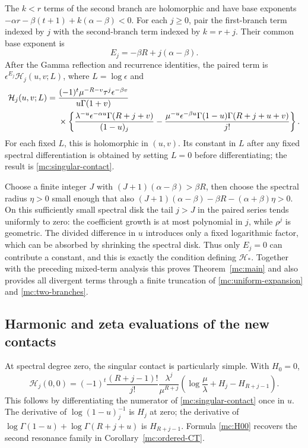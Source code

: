 \documentclass[11pt,a4paper]{article}
\numberwithin{equation}{section}
\theoremstyle{definition}
\theoremstyle{remark}
\begin{document}
The $k<r$ terms of the second branch are holomorphic and have
base exponents
$-\alpha r-\beta(t+1)+k(\alpha-\beta)<0$.
For each $j\ge0$, pair the first-branch term indexed by $j$ with
the second-branch term indexed by $k=r+j$. Their common base
exponent is
\begin{equation}\label{mc:paired-exponent}
                    E_j=-\beta R+j(\alpha-\beta).
\end{equation}
After the Gamma reflection and recurrence identities, the paired
term is $\epsilon^{E_j}\mathcal H_j(u,v;L)$, where $L=\log\epsilon$
and
\begin{align}\label{mc:H-log}
 \mathcal H_j(u,v;L)={}&
 \frac{(-1)^t\mu^{-R-v}\tau^j\epsilon^{-\beta v}}
                   {u\Gamma(1+v)}\notag\\
 &\times\left\{
 \frac{\lambda^{-u}\epsilon^{-\alpha u}\Gamma(R+j+v)}{(1-u)_j}
 -\frac{\mu^{-u}\epsilon^{-\beta u}
              \Gamma(1-u)\Gamma(R+j+u+v)}{j!}\right\}.
\end{align}
For each fixed $L$, this is holomorphic in $(u,v)$.
Its constant in $L$ after any fixed spectral differentiation is
obtained by setting $L=0$ before differentiating; the result is
\eqref{mc:singular-contact}.

Choose a finite integer $J$ with $(J+1)(\alpha-\beta)>\beta R$,
then choose the spectral radius $\eta>0$ small enough that also
$(J+1)(\alpha-\beta)-\beta R-(\alpha+\beta)\eta>0$.
On this sufficiently small spectral disk the tail $j>J$ in the
paired series tends uniformly to zero: the coefficient growth
is at most polynomial in $j$, while $\rho^j$ is geometric.
The divided difference in $u$ introduces only a fixed logarithmic
factor, which can be absorbed by shrinking the spectral disk.
Thus only $E_j=0$ can contribute a constant, and this is exactly
the condition defining $\mathcal H_*$. Together with the preceding
mixed-term analysis this proves Theorem~\ref{mc:main} and also
provides all divergent terms through a finite truncation of
\eqref{mc:uniform-expansion} and \eqref{mc:two-branches}.

\subsection{Harmonic and zeta evaluations of the new contacts}

At spectral degree zero, the singular contact is particularly
simple. With $H_0=0$,
\begin{equation}\label{mc:H00}
 \boxed{\displaystyle
 \mathcal H_j(0,0)=(-1)^t\frac{(R+j-1)!}{j!}
       \frac{\lambda^j}{\mu^{R+j}}
             \left(\log\frac\mu\lambda+H_j-H_{R+j-1}\right).}
\end{equation}
This follows by differentiating the numerator of
\eqref{mc:singular-contact} once in $u$.
The derivative of $\log(1-u)_j^{-1}$ is $H_j$ at zero;
the derivative of
$\log\Gamma(1-u)+\log\Gamma(R+j+u)$ is $H_{R+j-1}$.
Formula \eqref{mc:H00} recovers the second resonance family in
Corollary~\ref{mc:ordered-CT}.
\end{document}
